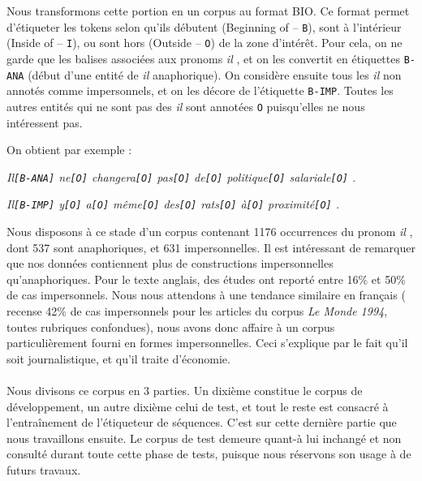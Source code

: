 \documentclass[a4paper,12pt]{article}
\begin{document}
Nous transformons cette portion en un corpus au format BIO. Ce format permet d'étiqueter les tokens selon qu'ils débutent (Beginning of -- \verb!B!), sont à l'intérieur (Inside of -- \verb!I!), ou sont hors (Outside -- \verb!O!) de la zone d'intérêt.
Pour cela, on ne garde que les balises associées aux pronoms \og \textit{il} \fg{}, et on les convertit en étiquettes \verb!B-ANA! (début d'une entité de \og \textit{il} \fg{} anaphorique). On considère ensuite tous les \og \textit{il} \fg{} non annotés comme impersonnels, et on les décore de l'étiquette \verb!B-IMP!. Toutes les autres entités qui ne sont pas des \og \textit{il} \fg{} sont annotées \verb!O! puisqu'elles ne nous intéressent pas.
\label{annotation-imp}

On obtient par exemple :

\textit{Il\verb![B-ANA]! ne\verb![O]! changera\verb![O]! pas\verb![O]! de\verb![O]! politique\verb![O]! salariale\verb![O]! .}

\textit{Il\verb![B-IMP]! y\verb![O]! a\verb![O]! même\verb![O]! des\verb![O]! rats\verb![O]! à\verb![O]! proximité\verb![O]! .}

Nous disposons à ce stade d'un corpus contenant 1176 occurrences du pronom \og \textit{il} \fg{}, dont 537 sont anaphoriques, et 631 impersonnelles. Il est intéressant de remarquer que nos données contiennent plus de constructions impersonnelles qu'anaphoriques. Pour le texte anglais, des études \citep{gundel} ont reporté entre 16\% et 50\% de cas impersonnels. Nous nous attendons à une tendance similaire en français (\citeauthor{danlos-ilimp-taln2005} recense 42\% de cas impersonnels pour les articles du corpus \textit{Le Monde 1994}, toutes rubriques confondues), nous avons donc affaire à un corpus particulièrement fourni en formes impersonnelles. Ceci s'explique par le fait qu'il soit journalistique, et qu'il traite d'économie.

\paragraph{}
Nous divisons ce corpus en 3 parties. Un dixième constitue le corpus de développement, un autre dixième celui de test, et tout le reste est consacré à l'entraînement de l'étiqueteur de séquences.
C'est sur cette dernière partie que nous travaillons ensuite.
Le corpus de test demeure quant-à lui inchangé et non consulté durant toute cette phase de tests, puisque nous réservons son usage à de futurs travaux.

\color{black}
\end{document}
